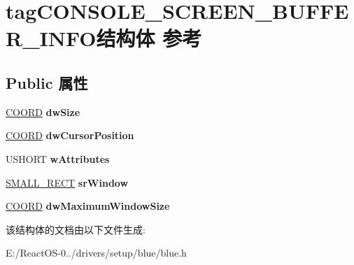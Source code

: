 \hypertarget{structtag_c_o_n_s_o_l_e___s_c_r_e_e_n___b_u_f_f_e_r___i_n_f_o}{}\section{tag\+C\+O\+N\+S\+O\+L\+E\+\_\+\+S\+C\+R\+E\+E\+N\+\_\+\+B\+U\+F\+F\+E\+R\+\_\+\+I\+N\+F\+O结构体 参考}
\label{structtag_c_o_n_s_o_l_e___s_c_r_e_e_n___b_u_f_f_e_r___i_n_f_o}
\subsection*{Public 属性}
\begin{DoxyCompactItemize}
\item 
\mbox{\label{structtag_c_o_n_s_o_l_e___s_c_r_e_e_n___b_u_f_f_e_r___i_n_f_o_a74a738c04468788bbe4e2544608cd21e}} 
\hyperlink{struct___c_o_o_r_d}{C\+O\+O\+RD} {\bfseries dw\+Size}
\item 
\mbox{\label{structtag_c_o_n_s_o_l_e___s_c_r_e_e_n___b_u_f_f_e_r___i_n_f_o_a1235eea9b9fcbba99d5f09e5e481ec20}} 
\hyperlink{struct___c_o_o_r_d}{C\+O\+O\+RD} {\bfseries dw\+Cursor\+Position}
\item 
\mbox{\label{structtag_c_o_n_s_o_l_e___s_c_r_e_e_n___b_u_f_f_e_r___i_n_f_o_a85bf0431891f1a673b8ca9ab8b94eedc}} 
U\+S\+H\+O\+RT {\bfseries w\+Attributes}
\item 
\mbox{\label{structtag_c_o_n_s_o_l_e___s_c_r_e_e_n___b_u_f_f_e_r___i_n_f_o_ab4f360392d535f168e6c04f47d37de39}} 
\hyperlink{structtag_s_m_a_l_l___r_e_c_t}{S\+M\+A\+L\+L\+\_\+\+R\+E\+CT} {\bfseries sr\+Window}
\item 
\mbox{\label{structtag_c_o_n_s_o_l_e___s_c_r_e_e_n___b_u_f_f_e_r___i_n_f_o_a015d157fc453a65f2c7455bbd2facb9a}} 
\hyperlink{struct___c_o_o_r_d}{C\+O\+O\+RD} {\bfseries dw\+Maximum\+Window\+Size}
\end{DoxyCompactItemize}


该结构体的文档由以下文件生成\+:\begin{DoxyCompactItemize}
\item 
E\+:/\+React\+O\+S-\/0../drivers/setup/blue/blue.\+h\end{DoxyCompactItemize}

